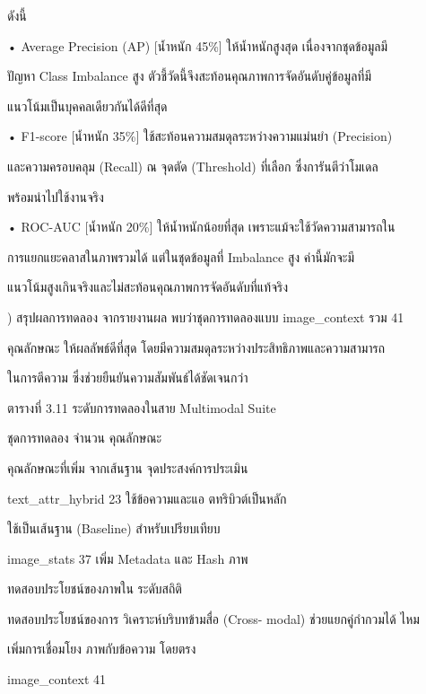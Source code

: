\documentclass[12pt,a4paper]{report}
\begin{document}
ดังนี้\par
\noindent • Average Precision (AP) [น้ำหนัก 45\%] ให้น้ำหนักสูงสุด เนื่องจากชุดข้อมูลมี\par
ปัญหา Class Imbalance สูง ตัวชี้วัดนี้จึงสะท้อนคุณภาพการจัดอันดับคู่ข้อมูลที่มี\par
แนวโน้มเป็นบุคคลเดียวกันได้ดีที่สุด\par
\noindent • F1-score [น้ำหนัก 35\%] ใช้สะท้อนความสมดุลระหว่างความแม่นยำ (Precision)\par
และความครอบคลุม (Recall) ณ จุดตัด (Threshold) ที่เลือก ซึ่งการันตีว่าโมเดล\par
พร้อมนำไปใช้งานจริง\par
\clearpage
\noindent • ROC-AUC [น้ำหนัก 20\%] ให้น้ำหนักน้อยที่สุด เพราะแม้จะใช้วัดความสามารถใน\par
การแยกแยะคลาสในภาพรวมได้ แต่ในชุดข้อมูลที่ Imbalance สูง ค่านี้มักจะมี\par
แนวโน้มสูงเกินจริงและไม่สะท้อนคุณภาพการจัดอันดับที่แท้จริง\par
{}) สรุปผลการทดลอง จากรายงานผล พบว่าชุดการทดลองแบบ image\_context รวม 41\par
คุณลักษณะ ให้ผลลัพธ์ดีที่สุด โดยมีความสมดุลระหว่างประสิทธิภาพและความสามารถ\par
ในการตีความ ซึ่งช่วยยืนยันความสัมพันธ์ได้ชัดเจนกว่า\par
\begin{center}\small ตารางที่ 3.11 ระดับการทดลองในสาย Multimodal Suite\end{center}
ชุดการทดลอง จำนวน คุณลักษณะ\par
คุณลักษณะที่เพิ่ม จากเส้นฐาน จุดประสงค์การประเมิน\par
text\_attr\_hybrid 23 ใช้ข้อความและแอ ตทริบิวต์เป็นหลัก\par
ใช้เป็นเส้นฐาน (Baseline) สำหรับเปรียบเทียบ\par
image\_stats 37 เพิ่ม Metadata และ Hash ภาพ\par
ทดสอบประโยชน์ของภาพใน ระดับสถิติ\par
ทดสอบประโยชน์ของการ วิเคราะห์บริบทข้ามสื่อ (Cross- modal) ช่วยแยกคู่กำกวมได้ ไหม\par
เพิ่มการเชื่อมโยง ภาพกับข้อความ โดยตรง\par
image\_context 41\par
\end{document}
